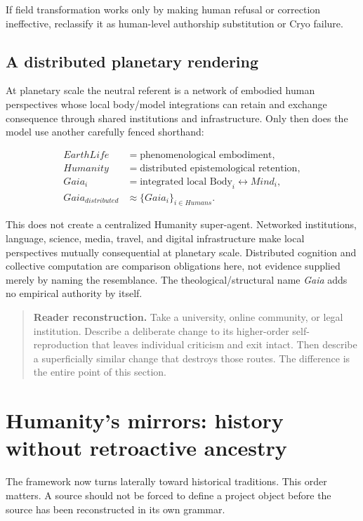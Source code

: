 \documentclass[11pt]{article}
\newenvironment{readercheck}{\begin{quote}\small\noindent\textbf{Reader reconstruction.}\;}{\end{quote}}
\begin{document}
If field transformation works only by making human refusal or correction ineffective, reclassify it as human-level authorship substitution or Cryo failure.

\subsection{A distributed planetary rendering}

At planetary scale the neutral referent is a network of embodied human perspectives whose local body/model integrations can retain and exchange consequence through shared institutions and infrastructure. Only then does the model use another carefully fenced shorthand:

\begin{align}
EarthLife &= \text{phenomenological embodiment},\\
Humanity &= \text{distributed epistemological retention},\\
Gaia_i &= \text{integrated local Body}_i\leftrightarrow Mind_i,\\
Gaia_{distributed} &\approx \{Gaia_i\}_{i\in Humans}.
\end{align}

This does not create a centralized Humanity super-agent. Networked institutions, language, science, media, travel, and digital infrastructure make local perspectives mutually consequential at planetary scale. Distributed cognition and collective computation are comparison obligations here, not evidence supplied merely by naming the resemblance. The theological/structural name \emph{Gaia} adds no empirical authority by itself.

\begin{readercheck}
Take a university, online community, or legal institution. Describe a deliberate change to its higher-order self-reproduction that leaves individual criticism and exit intact. Then describe a superficially similar change that destroys those routes. The difference is the entire point of this section.
\end{readercheck}

\section{Humanity's mirrors: history without retroactive ancestry}

The framework now turns laterally toward historical traditions. This order matters. A source should not be forced to define a project object before the source has been reconstructed in its own grammar.
\end{document}
